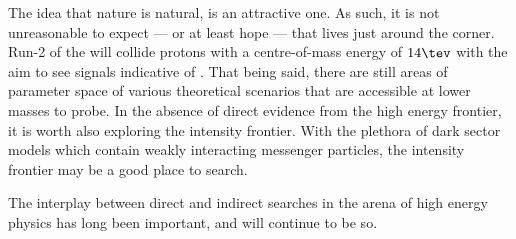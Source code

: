 The idea that nature is natural, is an attractive one.
As such, it is not unreasonable to expect --- or at least hope --- that \np lives just
around the corner.
Run-2 of the \lhc will collide protons with a centre-of-mass energy of $14\tev$ with the aim to see
signals indicative of \np.
That being said, there are still areas of parameter space of various theoretical scenarios that are
accessible at lower masses to probe.
In the absence of direct evidence from the high energy frontier, it is worth also exploring the
intensity frontier.
With the plethora of dark sector models which contain weakly interacting messenger particles, the
intensity frontier may be a good place to search.

The interplay between direct and indirect searches in the arena of high energy physics
has long been important, and will continue to be so.






%
%
%
%
%








